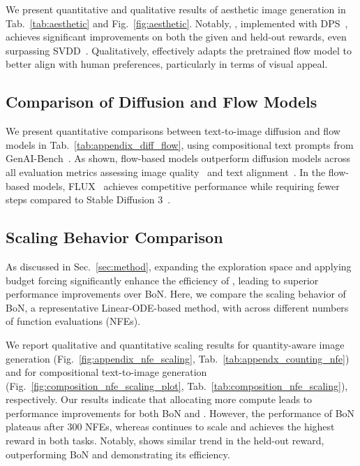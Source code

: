 We present quantitative and qualitative results of aesthetic image generation in Tab.~\ref{tab:aesthetic} and Fig.~\ref{fig:aesthetic}. Notably, \Ours{}, implemented with DPS~\cite{Chung:2023DPS}, achieves significant improvements on both the given and held-out rewards, even surpassing SVDD~\cite{Li2024:SVDD}. Qualitatively, \Ours{} effectively adapts the pretrained flow model to better align with human preferences, particularly in terms of visual appeal.  


\subsection{Comparison of Diffusion and Flow Models}
\label{sec:appendix_diff_flow}
We present quantitative comparisons between text-to-image diffusion and flow models in Tab.~\ref{tab:appendix_diff_flow}, using compositional text prompts from GenAI-Bench~\cite{Jiang:2024GenAI}.
As shown, flow-based models outperform diffusion models across all evaluation metrics assessing image quality~\cite{Xu2023:ImageReward, Wu2023:hps, Kirstain2023:pickapic} and text alignment~\cite{radford2021:CLIP, Xu2023:ImageReward}. In the flow-based models, FLUX~\cite{BlackForestLabs:2024Flux} achieves competitive performance while requiring fewer steps compared to Stable Diffusion 3~\cite{Esser2403:scaling}. 

\subsection{Scaling Behavior Comparison}
As discussed in Sec.~\ref{sec:method}, expanding the exploration space and applying budget forcing significantly enhance the efficiency of \Ours{}, leading to superior performance improvements over BoN. 
Here, we compare the scaling behavior of BoN, a representative Linear-ODE-based method, with \Ours{} across different numbers of function evaluations (NFEs). 

We report qualitative and quantitative scaling results for quantity-aware image generation (Fig.~\ref{fig:appendix_nfe_scaling}, Tab.~\ref{tab:appendx_counting_nfe}) and for compositional text-to-image generation (Fig.~\ref{fig:composition_nfe_scaling_plot}, Tab.~\ref{tab:composition_nfe_scaling}), respectively.
% 
Our results indicate that allocating more compute leads to performance improvements for both BoN and \Ours{}. 
% 
However, the performance of BoN plateaus after $300$ NFEs, whereas \Ours{} continues to scale and achieves the highest reward in both tasks.  
Notably, \Ours{} shows similar trend in the held-out reward, outperforming BoN and demonstrating its efficiency. 

